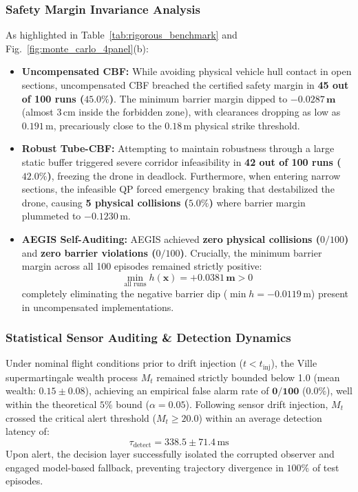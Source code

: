 \documentclass[11pt,a4paper]{article}
\begin{document}
\subsubsection{Safety Margin Invariance Analysis}
As highlighted in Table~\ref{tab:rigorous_benchmark} and Fig.~\ref{fig:monte_carlo_4panel}(b):
\begin{itemize}[leftmargin=16pt, itemsep=2pt]
    \item \textbf{Uncompensated CBF:} While avoiding physical vehicle hull contact in open sections, uncompensated CBF breached the certified safety margin in \textbf{45 out of 100 runs ($45.0\%$)}. The minimum barrier margin dipped to $\mathbf{-0.0287\,\text{m}}$ (almost $3\,$cm inside the forbidden zone), with clearances dropping as low as $0.191\,$m, precariously close to the $0.18\,$m physical strike threshold.
    \item \textbf{Robust Tube-CBF:} Attempting to maintain robustness through a large static buffer triggered severe corridor infeasibility in \textbf{42 out of 100 runs ($42.0\%$)}, freezing the drone in deadlock. Furthermore, when entering narrow sections, the infeasible QP forced emergency braking that destabilized the drone, causing \textbf{5 physical collisions ($5.0\%$)} where barrier margin plummeted to $-0.1230\,$m.
    \item \textbf{AEGIS Self-Auditing:} AEGIS achieved \textbf{zero physical collisions ($0/100$)} and \textbf{zero barrier violations ($0/100$)}. Crucially, the minimum barrier margin across all 100 episodes remained strictly positive:
    $$\min_{\text{all runs}} h(\mathbf{x}) = \mathbf{+0.0381\,\text{m}} > 0$$
    completely eliminating the negative barrier dip ($\min h = -0.0119\,$m) present in uncompensated implementations.
\end{itemize}

\subsubsection{Statistical Sensor Auditing \& Detection Dynamics}
Under nominal flight conditions prior to drift injection ($t < t_{\text{inj}}$), the Ville supermartingale wealth process $M_t$ remained strictly bounded below 1.0 (mean wealth: $0.15 \pm 0.08$), achieving an empirical false alarm rate of $\mathbf{0/100}$ ($0.0\%$), well within the theoretical $5\%$ bound ($\alpha = 0.05$). Following sensor drift injection, $M_t$ crossed the critical alert threshold ($M_t \ge 20.0$) within an average detection latency of:
$$\tau_{\text{detect}} = 338.5 \pm 71.4\,\text{ms}$$
Upon alert, the decision layer successfully isolated the corrupted observer and engaged model-based fallback, preventing trajectory divergence in $100\%$ of test episodes.
\end{document}
